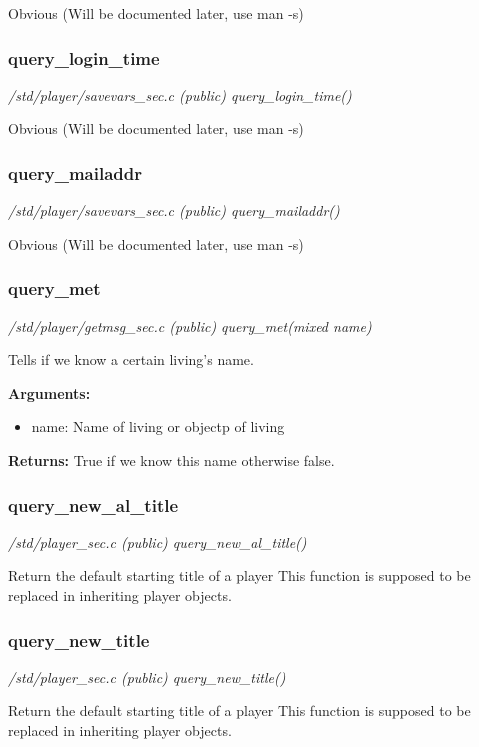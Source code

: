 Obvious (Will be documented later, use man -s)


\subsubsection{query\_login\_time}

{\em /std/player/savevars\_sec.c (public) query\_login\_time()}

Obvious (Will be documented later, use man -s)


\subsubsection{query\_mailaddr}

{\em /std/player/savevars\_sec.c (public) query\_mailaddr()}

Obvious (Will be documented later, use man -s)


\subsubsection{query\_met}

{\em /std/player/getmsg\_sec.c (public) query\_met(mixed name)}

Tells if we know a certain living's name.

{\bf Arguments:}
\begin{itemize}
\item      name: Name of living or objectp of living
\end{itemize}

{\bf Returns:}        True if we know this name otherwise false.


\subsubsection{query\_new\_al\_title}

{\em /std/player\_sec.c (public) query\_new\_al\_title()}

Return the default starting title of a player
This function is supposed to be replaced in inheriting
player objects.


\subsubsection{query\_new\_title}

{\em /std/player\_sec.c (public) query\_new\_title()}

Return the default starting title of a player
This function is supposed to be replaced in inheriting
player objects.


